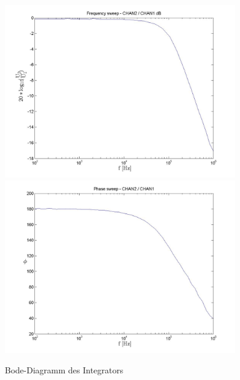 \documentclass[10pt]{scrreprt}
\begin{document}
    \begin{center}
        \begin{figure}[H]
            \includegraphics[width=0.9\textwidth]{FS54_frequencysweep_ylogxlog.jpg}
            \includegraphics[width=0.9\textwidth]{PS54_phasesweep_xlog.jpg}
            \label{fig:Bod}
            \caption{Bode-Diagramm des Integrators}
        \end{figure}
    \end{center}
\end{document}
